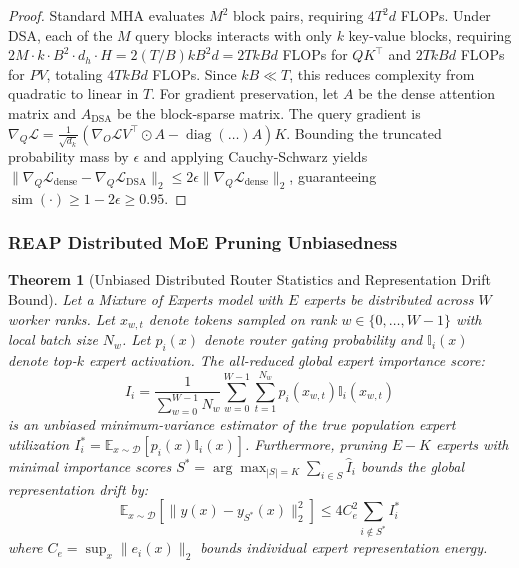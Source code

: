 \documentclass{article}
\newtheorem{theorem}{Theorem}
\begin{document}
\begin{proof}
Standard MHA evaluates $M^2$ block pairs, requiring $4 T^2 d$ FLOPs. Under DSA, each of the $M$ query blocks interacts with only $k$ key-value blocks, requiring $2 M \cdot k \cdot B^2 \cdot d_h \cdot H = 2 (T/B) k B^2 d = 2 T k B d$ FLOPs for $Q K^\top$ and $2 T k B d$ FLOPs for $P V$, totaling $4 T k B d$ FLOPs. Since $k B \ll T$, this reduces complexity from quadratic to linear in $T$. For gradient preservation, let $A$ be the dense attention matrix and $A_{\text{DSA}}$ be the block-sparse matrix. The query gradient is $\nabla_Q \mathcal{L} = \frac{1}{\sqrt{d_k}} (\nabla_O \mathcal{L} V^\top \odot A - \operatorname{diag}(\dots) A) K$. Bounding the truncated probability mass by $\epsilon$ and applying Cauchy-Schwarz yields $\|\nabla_Q \mathcal{L}_{\text{dense}} - \nabla_Q \mathcal{L}_{\text{DSA}}\|_2 \le 2\epsilon \|\nabla_Q \mathcal{L}_{\text{dense}}\|_2$, guaranteeing $\operatorname{sim}(\cdot) \ge 1 - 2\epsilon \ge 0.95$.
\end{proof}

\subsubsection{REAP Distributed MoE Pruning Unbiasedness}
\begin{theorem}[Unbiased Distributed Router Statistics and Representation Drift Bound]
\label{thm:reap_moe_proof}
Let a Mixture of Experts model with $E$ experts be distributed across $W$ worker ranks. Let $x_{w, t}$ denote tokens sampled on rank $w \in \{0, \dots, W-1\}$ with local batch size $N_w$. Let $p_i(x)$ denote router gating probability and $\mathbb{I}_i(x)$ denote top-$k$ expert activation.
The all-reduced global expert importance score:
\begin{equation}
    \widehat{I}_i = \frac{1}{\sum_{w=0}^{W-1} N_w} \sum_{w=0}^{W-1} \sum_{t=1}^{N_w} p_i(x_{w, t}) \mathbb{I}_i(x_{w, t})
\end{equation}
is an unbiased minimum-variance estimator of the true population expert utilization $I_i^* = \mathbb{E}_{x \sim \mathcal{D}}[p_i(x) \mathbb{I}_i(x)]$.
Furthermore, pruning $E - K$ experts with minimal importance scores $S^* = \arg\max_{|S|=K} \sum_{i \in S} \widehat{I}_i$ bounds the global representation drift by:
\begin{equation}
    \mathbb{E}_{x \sim \mathcal{D}} \left[ \|y(x) - y_{S^*}(x)\|_2^2 \right] \le 4 C_e^2 \sum_{i \notin S^*} I_i^*
\end{equation}
where $C_e = \sup_{x} \|e_i(x)\|_2$ bounds individual expert representation energy.
\end{theorem}
\end{document}
